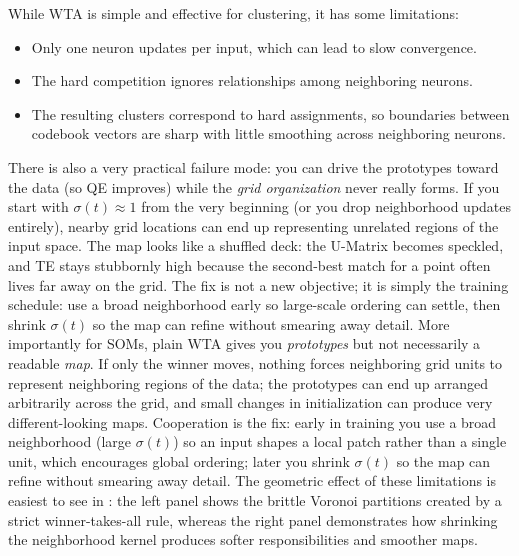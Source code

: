 While WTA is simple and effective for clustering, it has some limitations:
\begin{itemize}
    \item Only one neuron updates per input, which can lead to slow convergence.
    \item The hard competition ignores relationships among neighboring neurons.
    \item The resulting clusters correspond to hard assignments, so boundaries between codebook vectors are sharp with little smoothing across neighboring neurons.
\end{itemize}
There is also a very practical failure mode: you can drive the prototypes toward the data (so QE improves) while the \emph{grid organization} never really forms. If you start with \(\sigma(t)\approx 1\) from the very beginning (or you drop neighborhood updates entirely), nearby grid locations can end up representing unrelated regions of the input space. The map looks like a shuffled deck: the U-Matrix becomes speckled, and TE stays stubbornly high because the second-best match for a point often lives far away on the grid. The fix is not a new objective; it is simply the training schedule: use a broad neighborhood early so large-scale ordering can settle, then shrink \(\sigma(t)\) so the map can refine without smearing away detail.
More importantly for SOMs, plain WTA gives you \emph{prototypes} but not necessarily a readable \emph{map}. If only the winner moves, nothing forces neighboring grid units to represent neighboring regions of the data; the prototypes can end up arranged arbitrarily across the grid, and small changes in initialization can produce very different-looking maps. Cooperation is the fix: early in training you use a broad neighborhood (large \(\sigma(t)\)) so an input shapes a local patch rather than a single unit, which encourages global ordering; later you shrink \(\sigma(t)\) so the map can refine without smearing away detail.
The geometric effect of these limitations is easiest to see in : the left panel shows the brittle Voronoi partitions created by a strict winner-takes-all rule, whereas the right panel demonstrates how shrinking the neighborhood kernel produces softer responsibilities and smoother maps.

